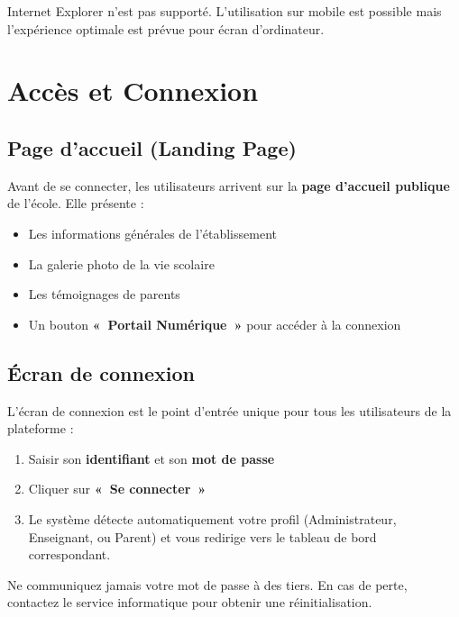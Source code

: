 \documentclass[12pt,a4paper]{report}
\begin{document}
\begin{warningbox}
Internet Explorer n'est pas supporté. L'utilisation sur mobile est possible mais l'expérience optimale est prévue pour écran d'ordinateur.
\end{warningbox}

\chapter{Accès et Connexion}

\section{Page d'accueil (Landing Page)}

Avant de se connecter, les utilisateurs arrivent sur la \textbf{page d'accueil publique} de l'école. Elle présente :
\begin{itemize}[leftmargin=*]
  \item Les informations générales de l'établissement
  \item La galerie photo de la vie scolaire
  \item Les témoignages de parents
  \item Un bouton \textbf{«~Portail Numérique~»} pour accéder à la connexion
\end{itemize}

\section{Écran de connexion}

L'écran de connexion est le point d'entrée unique pour tous les utilisateurs de la plateforme :

\begin{enumerate}[leftmargin=*]
  \item Saisir son \textbf{identifiant} et son \textbf{mot de passe}
  \item Cliquer sur \textbf{«~Se connecter~»}
  \item Le système détecte automatiquement votre profil (Administrateur, Enseignant, ou Parent) et vous redirige vers le tableau de bord correspondant.
\end{enumerate}

\begin{warningbox}
Ne communiquez jamais votre mot de passe à des tiers. En cas de perte, contactez le service informatique pour obtenir une réinitialisation.
\end{warningbox}
\end{document}
